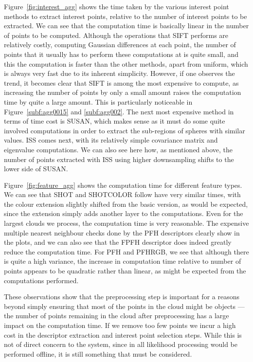 \documentclass[11pt,a4paper]{kth-mag}
\begin{document}
Figure~\ref{fig:interest_agg} shows the time taken by the various interest point
methods to extract interest points, relative to the number of interest points to
be extracted. We can see that the computation time is basically linear in the
number of points to be computed. Although the operations that SIFT performs are
relatively costly, computing Gaussian differences at each point, the number of
points that it usually has to perform these computations at is quite small, and
this the computation is faster than the other methods, apart from uniform, which
is always very fast due to its inherent simplicity. However, if one observes the
trend, it becomes clear that SIFT is among the most expensive to compute, as
increasing the number of points by only a small amount raises the computation
time by quite a large amount. This is particularly noticeable in
Figure~\ref{subf:agg0015} and \ref{subf:agg002}. The next most expensive method
in terms of time cost is SUSAN, which makes sense as it must do some quite
involved computations in order to extract the sub-regions of spheres with
similar values. ISS comes next, with its relatively simple covariance matrix and
eigenvalue computations. We can also see here how, as mentioned above, the
number of points extracted with ISS using higher downsampling shifts to the
lower side of SUSAN.

Figure~\ref{fig:feature_agg} shows the computation time for different feature
types. We can see that SHOT and SHOTCOLOR follow have very similar times, with
the colour extension slightly shifted from the basic version, as would be
expected, since the extension simply adds another layer to the computations.
Even for the largest clouds we process, the computation time is very reasonable.
The expensive multiple nearest neighbour checks done by the PFH descriptors
clearly show in the plots, and we can also see that the FPFH descriptor does
indeed greatly reduce the computation time. For PFH and PFHRGB, we see that
although there is quite a high variance, the increase in computation time
relative to number of points appears to be quadratic rather than linear, as
might be expected from the computations performed.

These observations show that the preprocessing step is important for a reasons
beyond simply ensuring that most of the points in the cloud might be objects ---
the number of points remaining in the cloud after preprocessing has a large
impact on the computation time. If we remove too few points we incur a high cost
in the descriptor extraction and interest point selection steps. While this is
not of direct concern to the system, since in all likelihood processing would be
performed offline, it is still something that must be considered.
\end{document}

